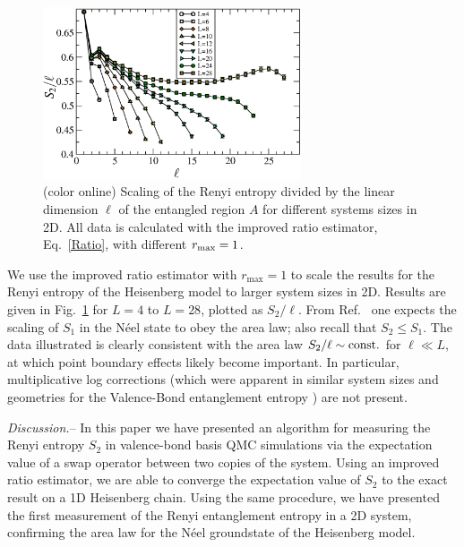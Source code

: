 \documentclass[prl,aps,twocolumn,floatfix,amsmath,amssymb,superscriptaddress,tightenlines]{revtex4}
\begin{document}
\begin{figure} {
\includegraphics[width=3in]{fig4.eps} \caption{(color online) 
\label{fig4}
Scaling of the Renyi entropy divided by the linear dimension $\ell$ of the entangled region $A$ for different systems sizes
in 2D.  All data is calculated with the improved ratio estimator, Eq.~\eqref{Ratio}, with different $r_{\rm max}=1$.  
}
} \end{figure}

We use the improved ratio estimator with $r_{\max}=1$ to scale the results for the Renyi entropy of the Heisenberg model to larger system sizes in 2D.  Results are given in Fig.~\ref{fig4} for $L=4$ to $L=28$, plotted as $S_2/\ell$.  From  Ref.~\cite{Ann}
one expects the scaling of $S_1$ in the N\'eel state to obey the area law; also recall that $S_2 \leq S_1$.  
The data illustrated is clearly consistent with the area law $S_2/\ell
\sim {\rm const.}$ for $\ell \ll L$, at which point boundary 
effects likely become important.  In particular, multiplicative log corrections (which were apparent in similar system sizes and geometries for the Valence-Bond entanglement entropy
\cite{Alet,Chh}) are not present.

{\it Discussion.}-- 
In this paper we have presented an algorithm for measuring the Renyi entropy $S_2$ in valence-bond basis QMC simulations via
the expectation value of a swap operator between two copies of the system.
Using an improved ratio estimator, we are able to converge the expectation value of $S_2$ to the exact
result on a 1D Heisenberg chain.
Using the same procedure, we have presented the first measurement of the Renyi entanglement entropy in a 2D system, confirming the area law for the N\'eel groundstate of the Heisenberg model.
\end{document}
